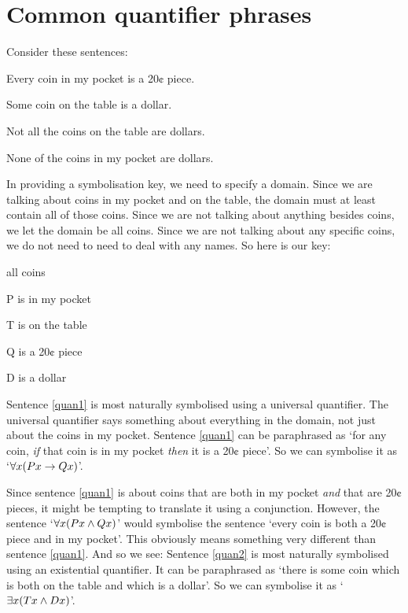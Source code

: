 \section{Common quantifier phrases}
Consider these sentences:
	\begin{earg}
		\item[\ex{quan1}] Every coin in my pocket is a 20¢ piece.
		\item[\ex{quan2}] Some coin on the table is a dollar.
		\item[\ex{quan3}] Not all the coins on the table are dollars.
		\item[\ex{quan4}] None of the coins in my pocket are dollars.
	\end{earg}
In providing a symbolisation key, we need to specify a domain. Since we are talking about coins in my pocket and on the table, the domain must at least contain all of those coins. Since we are not talking about anything besides coins, we let the domain be all coins. Since we are not talking about any specific coins, we do not need to need to deal with any names. So here is our key:
	\begin{ekey}
		\item[\text{domain}] all coins
		\item[P]  is in my pocket
		\item[T]  is on the table
		\item[Q]  is a 20¢ piece
		\item[D]  is a dollar
	\end{ekey}
Sentence \ref{quan1} is most naturally symbolised using a universal quantifier. The universal quantifier says something about everything in the domain, not just about the coins in my pocket. Sentence \ref{quan1} can be paraphrased as `for any coin, \emph{if} that coin is in my pocket \emph{then} it is a 20¢ piece'. So we can symbolise it as `$\forall x(Px \rightarrow Qx)$'.

Since sentence \ref{quan1} is about coins that are both in my pocket \emph{and} that are 20¢ pieces, it might be tempting to translate it using a conjunction. However, the sentence `$\forall x(Px \wedge Qx)$' would symbolise the sentence `every coin is both a 20¢ piece and in my pocket'. This obviously means something very different than sentence \ref{quan1}. And so we see:
Sentence \ref{quan2} is most naturally symbolised using an existential quantifier. It can be paraphrased as `there is some coin which is both on the table and which is a dollar'. So we can symbolise it as `$\exists x(Tx \wedge Dx)$'.


